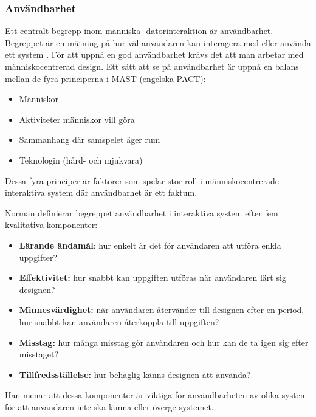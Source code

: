 \subsubsection{Användbarhet}
Ett centralt begrepp inom människa- datorinteraktion är användbarhet. Begreppet är en mätning på hur väl användaren kan interagera med eller använda ett system \cite{Blanton2009Human-ComputerInteraction}.
För att uppnå en god användbarhet krävs det att man arbetar med människocentrerad design\cite{BenyonDesigningDesign}. Ett sätt att se på användbarhet är uppnå en balans mellan de fyra principerna i MAST (engelska PACT)\cite{BenyonDesigningDesign}: 

\begin{itemize}
\item Människor
\item Aktiviteter människor vill göra
\item Sammanhang där samspelet äger rum
\item Teknologin (hård- och mjukvara)
\end{itemize}

Dessa fyra principer är faktorer som spelar stor roll i människocentrerade interaktiva system där användbarhet är ett faktum.
\newline

Norman  definierar begreppet användbarhet i interaktiva system efter fem kvalitativa komponenter\cite{UsabilityUsability}: 
\begin{itemize}
\item \textbf{Lärande ändamål}: hur enkelt är det för användaren att utföra enkla uppgifter? 
\item\textbf{Effektivitet:} hur snabbt kan uppgiften utföras när användaren lärt sig designen? 
\item \textbf{Minnesvärdighet:} när användaren återvänder till designen efter en period, hur snabbt kan användaren återkoppla till uppgiften? 
\item\textbf{Misstag:} hur många misstag gör användaren och hur kan de ta igen sig efter misstaget?
\item\textbf{Tillfredsställelse:} hur behaglig känns designen att använda? 
\end{itemize}

Han menar att dessa komponenter är viktiga för användbarheten av olika system för att användaren inte ska lämna eller överge systemet. 
 

